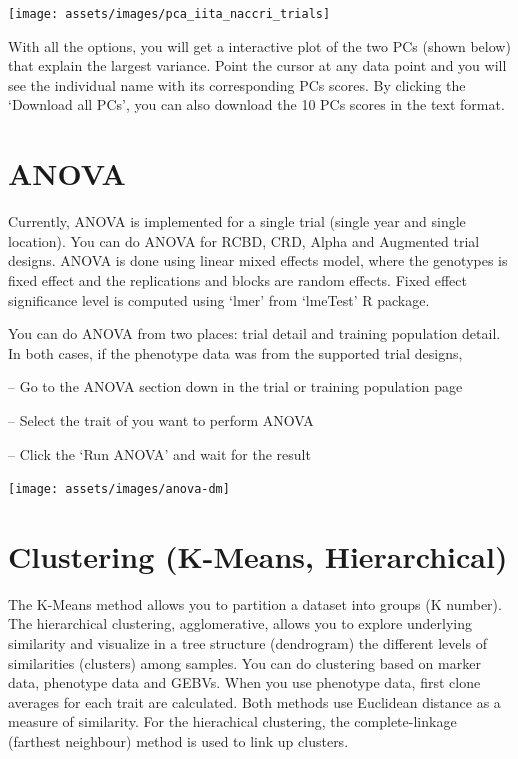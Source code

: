 \documentclass[
  12pt,
]{book}
\begin{document}
\begin{center}\texttt{[image: assets/images/pca\_iita\_naccri\_trials]} \end{center}

With all the options, you will get a interactive plot of the two PCs (shown below) that explain the largest variance. Point the cursor at any data point and you will see the individual name with its corresponding PCs scores. By clicking the `Download all PCs', you can also download the 10 PCs scores in the text format.

\hypertarget{anova}{%
\section{ANOVA}\label{anova}}

Currently, ANOVA is implemented for a single trial (single year and single location). You can do ANOVA for RCBD, CRD, Alpha and Augmented trial designs. ANOVA is done using linear mixed effects model, where the genotypes is fixed effect and the replications and blocks are random effects. Fixed effect significance level is computed using `lmer' from `lmeTest' R package.

You can do ANOVA from two places: trial detail and training population detail. In both cases, if the phenotype data was from the supported trial designs,

-- Go to the ANOVA section down in the trial or training population page

-- Select the trait of you want to perform ANOVA

-- Click the `Run ANOVA' and wait for the result

\begin{center}\texttt{[image: assets/images/anova-dm]} \end{center}

\hypertarget{clustering-k-means-hierarchical}{%
\section{Clustering (K-Means, Hierarchical)}\label{clustering-k-means-hierarchical}}

The K-Means method allows you to partition a dataset into groups (K number). The hierarchical clustering, agglomerative, allows you to explore underlying similarity and visualize in a tree structure (dendrogram) the different levels of similarities (clusters) among samples. You can do clustering based on marker data, phenotype data and GEBVs. When you use phenotype data, first clone averages for each trait are calculated. Both methods use Euclidean distance as a measure of similarity. For the hierachical clustering, the complete-linkage (farthest neighbour) method is used to link up clusters.
\end{document}
